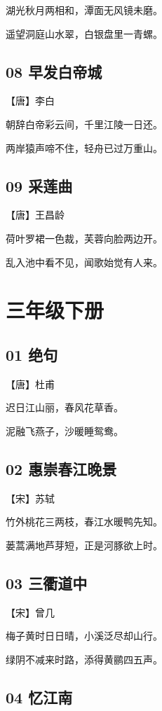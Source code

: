 \documentclass[a6paper, 12pt]{article}
\begin{document}
湖光秋月两相和，潭面无风镜未磨。

遥望洞庭山水翠，白银盘里一青螺。

\subsection*{08 早发白帝城}

【唐】李白

朝辞白帝彩云间，千里江陵一日还。

两岸猿声啼不住，轻舟已过万重山。

\subsection*{09 采莲曲}

【唐】王昌龄

荷叶罗裙一色裁，芙蓉向脸两边开。

乱入池中看不见，闻歌始觉有人来。

\newpage

\section*{三年级下册}

\subsection*{01 绝句}

【唐】杜甫

迟日江山丽，春风花草香。

泥融飞燕子，沙暖睡鸳鸯。

\subsection*{02 惠崇春江晚景}

【宋】苏轼

竹外桃花三两枝，春江水暖鸭先知。

蒌蒿满地芦芽短，正是河豚欲上时。

\subsection*{03 三衢道中}

【宋】曾几

梅子黄时日日晴，小溪泛尽却山行。

绿阴不减来时路，添得黄鹂四五声。

\subsection*{04 忆江南}
\end{document}
